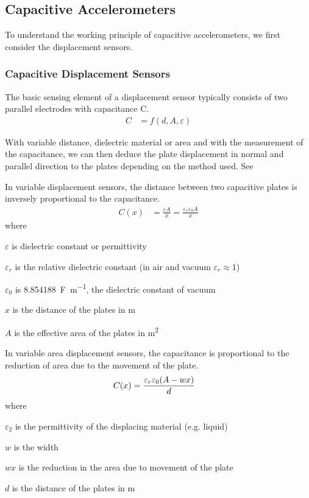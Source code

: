\subsection{Capacitive Accelerometers}

To understand the working principle of capacitive accelerometers, we first consider the displacement sensors.

\subsubsection{Capacitive Displacement Sensors}
The basic sensing element of a displacement sensor typically consists of two parallel electrodes with capacitance C.
\begin{align}
    C &= f(d,A,\varepsilon)
\end{align}

With variable distance, dielectric material or area and with the measurement of the capacitance, we can then deduce the plate displacement in normal and parallel direction to the plates depending on the method used. See 

In variable displacement sensors, the distance between two capacitive plates is inversely proportional to the capacitance.
\begin{align}
    C(x) &= \frac{\varepsilon A}{x} = \frac{\varepsilon_r\varepsilon_0 A}{x}
\end{align}
where
\begin{description}[topsep=0ex, noitemsep]
    \item $\varepsilon$ is dielectric constant or permittivity
    \item $\varepsilon_r$ is the relative dielectric constant (in air and vacuum $\varepsilon_r\approx 1$)
    \item $\varepsilon_0$ is \SI{8.854188}{\farad\per\meter}, the dielectric constant of vacuum
    \item $x$ is the distance of the plates in \si{\meter}
    \item $A$ is the effective area of the plates in \si{\meter\squared}
\end{description}

In variable area displacement sensors, the capacitance is proportional to the reduction of area due to the movement of the plate.
\begin{align}
   C(x) &= \frac{\varepsilon_r\varepsilon_0\pqty{A-wx}}{d}\label{eqn:var_ar_displace}
\end{align}
where
\begin{description}[topsep=0ex, noitemsep]
    \item $\varepsilon_2$ is the permittivity of the displacing material (e.g. liquid)
    \item $w$ is the width
    \item $wx$ is the reduction in the area due to movement of the plate
    \item $d$ is the distance of the plates in \si{\meter}
\end{description}


